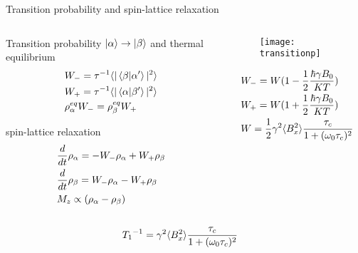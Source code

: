 \begin{frame}{Transition probability and spin-lattice relaxation}
\begin{columns}[T]
\begin{column}{0.6\textwidth}
\begin{block}{Transition probability $\ket{\alpha}\to\ket{\beta}$ and thermal equilibrium}
\begin{align*}
&W_-={\tau}^{-1}\langle |\braket{\beta|\alpha'}|^2 \rangle\\
&W_+={\tau}^{-1}\langle |\braket{\alpha|\beta'}|^2 \rangle\\
&\rho_{\alpha}^{eq}W_-=\rho_{\beta}^{eq}W_+
\end{align*}
\end{block}
\begin{block}{spin-lattice relaxation}
\begin{align*}
&\frac{d}{d t}\rho_{\alpha}=-W_-\rho_{\alpha}+W_+\rho_{\beta}\\
&\frac{d}{d t}\rho_{\beta}=W_-\rho_{\alpha}-W_+\rho_{\beta}\\
&M_z\propto(\rho_{\alpha}-\rho_{\beta})
\end{align*}
\end{block}
\end{column}
\begin{column}{0.4\textwidth}
\begin{figure}
    \centering
    \texttt{[image: transitionp]}
    \label{fig:transitionp}
\end{figure}
\begin{align*}
&W_-=W(1-\frac{1}{2}\frac{\hbar\gamma B_0}{KT})\\
&W_+=W(1+\frac{1}{2}\frac{\hbar\gamma B_0}{KT})\\
&W=\frac{1}{2}\gamma^2\langle B_x^2 \rangle\frac{\tau_c}{1+(\omega_0\tau_c)^2}
\end{align*}
\end{column}
\end{columns}
\begin{align*}
&{T_1}^{-1}=\gamma^2\langle B_x^2 \rangle\frac{\tau_c}{1+(\omega_0\tau_c)^2}
\end{align*}
\end{frame}


